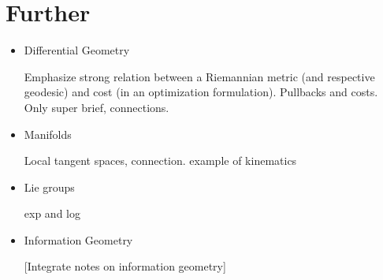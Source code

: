 



\section{Further}

\begin{itemize}
\item Differential Geometry

Emphasize strong relation between a Riemannian metric (and respective geodesic) and cost (in an optimization formulation). Pullbacks and costs. Only super brief, connections.

\item Manifolds

Local tangent spaces, connection. example of kinematics

\item Lie groups

exp and log

\item Information Geometry

[Integrate notes on information geometry]

\end{itemize}





